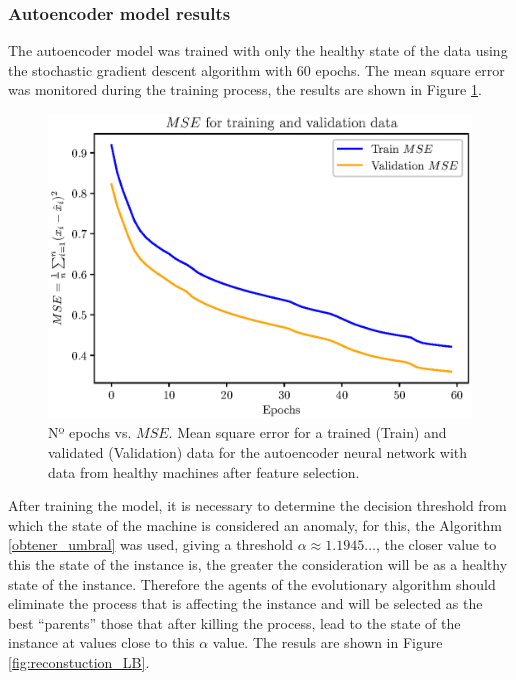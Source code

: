 \documentclass{iosart2c}
\begin{document}
\subsubsection{Autoencoder model results}\label{results_autoencoder}

The autoencoder model was trained with only the healthy state of the data using the stochastic gradient descent algorithm with 60 epochs. The mean square error was monitored during the training process, the results are shown in Figure \ref{fig:autoencoder_variable_selected}.



\begin{figure}[h!]
\centering
\includegraphics[scale=0.56]{figs/autoencoder/final_autoencoder.eps}
\caption{Nº epochs vs. $MSE$. Mean square error for a trained (Train) and validated (Validation) data for the autoencoder neural network with data from healthy machines after feature selection.}
\label{fig:autoencoder_variable_selected}
\end{figure}

After training the model, it is necessary to determine the decision threshold from which the state of the machine is considered an anomaly, for this, the Algorithm \ref{obtener_umbral} was used, giving a threshold $\alpha\approx 1.1945\ldots$, the closer value to this the state of the instance is, the greater the consideration will be as a healthy state of the instance. Therefore the agents of the evolutionary algorithm should eliminate the process that is affecting the instance and will be selected as the best ``parents'' those that after killing the process, lead to the state of the instance at values close to this $\alpha$ value. The resuls are shown in Figure \ref{fig:reconstuction_LB}.
\end{document}
